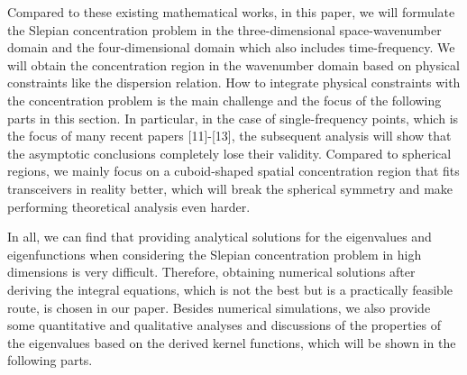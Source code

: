 \documentclass[a4paper,12pt]{article}
\begin{document}
\begin{framed}
{		\quad Compared to these existing mathematical works, in this paper, we will formulate the Slepian concentration problem in the three-dimensional space-wavenumber domain and the four-dimensional domain which also includes time-frequency. We will obtain the concentration region in the wavenumber domain based on physical constraints like the dispersion relation. How to integrate physical constraints with the concentration problem is the main challenge and the focus of the following parts in this section. In particular, in the case of single-frequency points, which is the focus of many recent papers [11]-[13], the subsequent analysis will show that the asymptotic conclusions completely lose their validity. Compared to spherical regions, we mainly focus on a cuboid-shaped spatial concentration region that fits transceivers in reality better, which will break the spherical symmetry and make performing theoretical analysis even harder.   
		
		\quad In all, we can find that providing analytical solutions for the eigenvalues and eigenfunctions when considering the Slepian concentration problem in high dimensions is very difficult. Therefore, obtaining numerical solutions after deriving the integral equations, which is not the best but is a practically feasible route, is chosen in our paper. Besides numerical simulations, we also provide some quantitative and qualitative analyses and discussions of the properties of the eigenvalues based on the derived kernel functions, which will be shown in the following parts.
	}

\end{framed}
\end{document}
